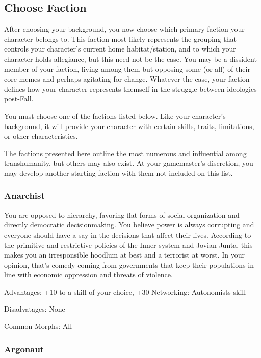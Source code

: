 \subsection{Choose Faction}
\label{sec:choose-faction}

After choosing your background, you now choose which primary faction your character belongs to. This faction most likely represents the grouping that controls your character’s current home habitat/station, and to which your character holds allegiance, but this need not be the case. You may be a dissident member of your faction, living among them but opposing some (or all) of their core memes and perhaps agitating for change. Whatever the case, your faction defines how your character represents themself in the struggle between ideologies post-Fall.

You must choose one of the factions listed below. Like your character’s background, it will provide your character with certain skills, traits, limitations, or other characteristics.

The factions presented here outline the most numerous and influential among transhumanity, but others may also exist. At your gamemaster’s discretion, you may develop another starting faction with them not included on this list.

\subsubsection{Anarchist}
\label{sec:anarchist}

You are opposed to hierarchy, favoring flat forms of social organization and directly democratic decisionmaking. You believe power is always corrupting and everyone should have a say in the decisions that affect their lives. According to the primitive and restrictive policies of the Inner system and Jovian Junta, this makes you an irresponsible hoodlum at best and a terrorist at worst. In your opinion, that’s comedy coming from governments that keep their populations in line with economic oppression and threats of violence.

Advantages: +10 to a skill of your choice, +30 Networking: Autonomists skill

Disadvatages: None

Common Morphs: All

\subsubsection{Argonaut}
\label{sec:argonaut}

